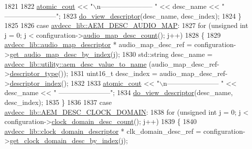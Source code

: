 \begin{DoxyCode}
1821 
1822             \hyperlink{cmd__line_8h_a0bc38ccc65c79ba06c6fcd7b4bf554c3}{atomic\_cout} << \textcolor{stringliteral}{"\(\backslash\)n----------------------- "} << desc\_name << \textcolor{stringliteral}{"
       -----------------------"};
1823             \hyperlink{classcmd__line_aef7d9f8c4eff85c46e5b7aea0961bb51}{do\_view\_descriptor}(desc\_name, desc\_index);
1824         \}
1825 
1826     \textcolor{keywordflow}{case} \hyperlink{namespaceavdecc__lib_ac7b7d227e46bc72b63ee9e9aae15902fab7cc7534edb71a30193e3c41bf920cf5}{avdecc\_lib::AEM\_DESC\_AUDIO\_MAP}:
1827         \textcolor{keywordflow}{for} (\textcolor{keywordtype}{unsigned} \textcolor{keywordtype}{int} j = 0; j < configuration->\hyperlink{classavdecc__lib_1_1configuration__descriptor_a591e29d13b318216c95007e92e05ff8f}{audio\_map\_desc\_count}(); j++)
1828         \{
1829             \hyperlink{classavdecc__lib_1_1audio__map__descriptor}{avdecc\_lib::audio\_map\_descriptor} * audio\_map\_desc\_ref = 
      configuration->\hyperlink{classavdecc__lib_1_1configuration__descriptor_a2d946ae36e146b7a1bbe30e31017f20f}{get\_audio\_map\_desc\_by\_index}(j);
1830             std::string desc\_name = \hyperlink{namespaceavdecc__lib_1_1utility_a6bdd02679e5a911a071d4aa03be341f0}{avdecc\_lib::utility::aem\_desc\_value\_to\_name}
      (audio\_map\_desc\_ref->\hyperlink{classavdecc__lib_1_1descriptor__base_a5112b70022171063ec5d3242bee9910e}{descriptor\_type}());
1831             uint16\_t desc\_index = audio\_map\_desc\_ref->\hyperlink{classavdecc__lib_1_1descriptor__base_a7eed5583bffdf72d89021b188648c1b5}{descriptor\_index}();
1832 
1833             \hyperlink{cmd__line_8h_a0bc38ccc65c79ba06c6fcd7b4bf554c3}{atomic\_cout} << \textcolor{stringliteral}{"\(\backslash\)n----------------------- "} << desc\_name << \textcolor{stringliteral}{"
       -----------------------"};
1834             \hyperlink{classcmd__line_aef7d9f8c4eff85c46e5b7aea0961bb51}{do\_view\_descriptor}(desc\_name, desc\_index);
1835         \}
1836 
1837     \textcolor{keywordflow}{case} \hyperlink{namespaceavdecc__lib_ac7b7d227e46bc72b63ee9e9aae15902fa9a2f5c4896329bb03b27b36e98ed5e93}{avdecc\_lib::AEM\_DESC\_CLOCK\_DOMAIN}:
1838         \textcolor{keywordflow}{for} (\textcolor{keywordtype}{unsigned} \textcolor{keywordtype}{int} j = 0; j < configuration->\hyperlink{classavdecc__lib_1_1configuration__descriptor_aaf707ea8fc30234388930ff17456f610}{clock\_domain\_desc\_count}(); j++)
1839         \{
1840             \hyperlink{classavdecc__lib_1_1clock__domain__descriptor}{avdecc\_lib::clock\_domain\_descriptor} * clk\_domain\_desc\_ref = 
      configuration->\hyperlink{classavdecc__lib_1_1configuration__descriptor_ab5603e0fa2cc0695b240fe856b62776d}{get\_clock\_domain\_desc\_by\_index}(j);

\end{DoxyCode}
